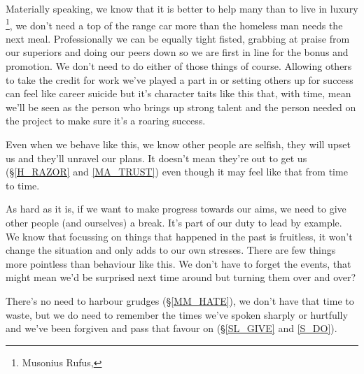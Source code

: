 \cleardoublepage
{\small

Materially speaking, we know that it is better to help many than to live in luxury \footnote{Musonius Rufus, }, we don't need a top of the range car more than the homeless man needs the next meal. Professionally we can be equally tight fisted, grabbing at praise from our superiors and doing our peers down so we are first in line for the bonus and promotion. We don't need to do either of those things of course. Allowing others to take the credit for work we've played a part in or setting others up for success can feel like career suicide but it's character taits like this that, with time, mean we'll be seen as the person who brings up strong talent and the person needed on the project to make sure it's a roaring success.

Even when we behave like this, we know other people are selfish, they will upset us and they'll unravel our plans. It doesn't mean they're out to get us (\S \ref{H_RAZOR} and \ref{MA_TRUST}) even though it may feel like that from time to time.

As hard as it is, if we want to make progress towards our aims, we need to give other people (and ourselves) a break. It's part of our duty to lead by example. We know that focussing on things that happened in the past is fruitless, it won't change the situation and only adds to our own stresses. There are few things more pointless than behaviour like this. We don't have to forget the events, that might mean we'd be surprised next time around but turning them over and over?

There's no need to harbour grudges (\S \ref{MM_HATE}), we don't have that time to waste, but we do need to remember the times we've spoken sharply or hurtfully and we've been forgiven and pass that favour on (\S \ref{SL_GIVE} and \ref{S_DO}). 

}
